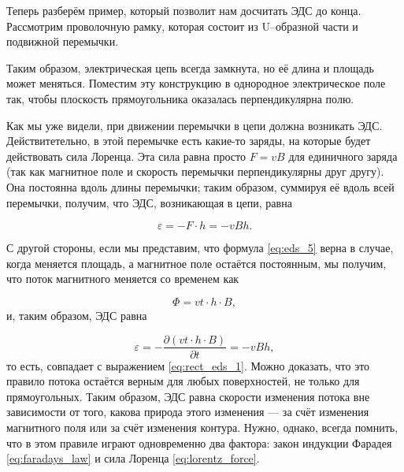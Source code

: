\documentclass[a4paper,12pt]{article}
\numberwithin{equation}{section}
\newcommand{\pt}{\partial}
\newcommand{\vareps}{\varepsilon}
\begin{document}
Теперь разберём пример, который позволит нам досчитать ЭДС до
конца. Рассмотрим проволочную рамку, которая состоит из U--образной
части и подвижной перемычки. 

\begin{figure}[h]
  \centering
  \label{fig:rect_b_field}
\end{figure}

Таким образом, электрическая цепь всегда замкнута, но её длина и
площадь может меняться. Поместим эту конструкцию в однородное
электрическое поле так, чтобы плоскость прямоугольника оказалась
перпендикулярна полю. 

Как мы уже видели, при движении перемычки в цепи должна возникать
ЭДС. Действитетельно, в этой перемычке есть какие-то заряды, на
которые будет действовать сила Лоренца. Эта сила равна просто $F = vB$
для единичного заряда (так как магнитное поле и скорость перемычки
перпендикулярны друг другу). Она постоянна вдоль длины перемычки;
таким образом, суммируя её вдоль всей перемычки, получим, что ЭДС,
возникающая в цепи, равна

\begin{equation}
  \label{eq:rect_eds_1}
  \vareps = - F \cdot h = - v B h.
\end{equation}

С другой стороны, если мы представим, что формула \eqref{eq:eds_5}
верна в случае, когда меняется площадь, а магнитное поле остаётся
постоянным, мы получим, что поток магнитного меняется со временем как 

\begin{equation}
  \label{eq:rect_eds_2}
  \Phi = vt\cdot h \cdot B,
\end{equation}
и, таким образом, ЭДС равна 

\begin{equation}
  \label{eq:rect_eds_3}
  \vareps = -\frac{\pt \left( vt \cdot h \cdot B \right)}{\pt t} = - v B h,
\end{equation}
то есть, совпадает с выражением \eqref{eq:rect_eds_1}. Можно доказать,
что это правило потока остаётся верным для любых поверхностей, не
только для прямоугольных. Таким образом, ЭДС равна скорости изменения
потока вне зависимости от того, какова природа этого изменения --- за
счёт изменения магнитного поля или за счёт изменения контура. Нужно,
однако, всегда помнить, что в этом правиле играют одновременно два
фактора: закон индукции Фарадея \eqref{eq:faradays_law} и сила Лоренца
\eqref{eq:lorentz_force}.
\end{document}
